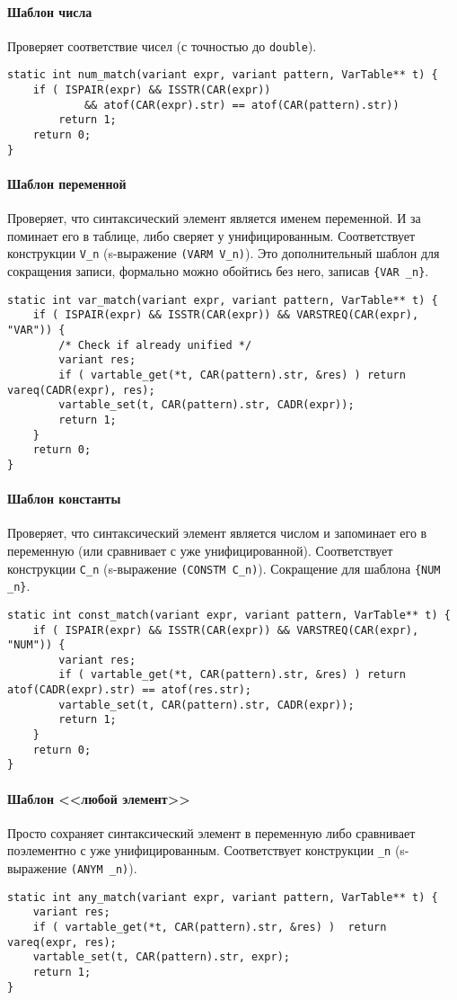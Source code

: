 \documentclass[10pt]{report}
\begin{document}
\paragraph{Шаблон числа} Проверяет соответствие чисел (с точностью до \verb|double|).
\begin{lstlisting}[firstnumber=68]
static int num_match(variant expr, variant pattern, VarTable** t) {
	if ( ISPAIR(expr) && ISSTR(CAR(expr))
			&& atof(CAR(expr).str) == atof(CAR(pattern).str))
		return 1;
	return 0;
}
\end{lstlisting}
\paragraph{Шаблон переменной} Проверяет, что синтаксический элемент является именем переменной. И за поминает его в таблице, либо сверяет у унифицированным.
Соответствует конструкции \verb|V_n| (s-выражение \verb|(VARM V_n)|). Это дополнительный шаблон для сокращения записи, формально можно обойтись без него, записав \verb|{VAR _n}|.
\begin{lstlisting}[firstnumber=75]
static int var_match(variant expr, variant pattern, VarTable** t) {
	if ( ISPAIR(expr) && ISSTR(CAR(expr)) && VARSTREQ(CAR(expr), "VAR")) {
		/* Check if already unified */
		variant res;
		if ( vartable_get(*t, CAR(pattern).str, &res) ) return vareq(CADR(expr), res);
		vartable_set(t, CAR(pattern).str, CADR(expr));
		return 1;
	} 
	return 0;
}
\end{lstlisting}
\paragraph{Шаблон константы} Проверяет, что синтаксический элемент является числом и запоминает его в переменную (или сравнивает с уже унифицированной).
Соответствует конструкции \verb|C_n| (s-выражение \verb|(CONSTM C_n)|). Сокращение для шаблона \verb|{NUM _n}|.
\begin{lstlisting}[firstnumber=86]
static int const_match(variant expr, variant pattern, VarTable** t) {
	if ( ISPAIR(expr) && ISSTR(CAR(expr)) && VARSTREQ(CAR(expr), "NUM")) {
		variant res;
		if ( vartable_get(*t, CAR(pattern).str, &res) ) return atof(CADR(expr).str) == atof(res.str);
		vartable_set(t, CAR(pattern).str, CADR(expr));
		return 1;
	}
	return 0;
}
\end{lstlisting}
\paragraph{Шаблон <<любой элемент>>} Просто сохраняет синтаксический элемент в переменную либо сравнивает поэлементно с уже унифицированным. Соответствует конструкции \verb|_n| (s-выражение \verb|(ANYM _n)|).
\begin{lstlisting}[firstnumber=96]
static int any_match(variant expr, variant pattern, VarTable** t) {
	variant res;
	if ( vartable_get(*t, CAR(pattern).str, &res) )  return vareq(expr, res);
	vartable_set(t, CAR(pattern).str, expr);
	return 1;
}
\end{lstlisting}
\end{document}
